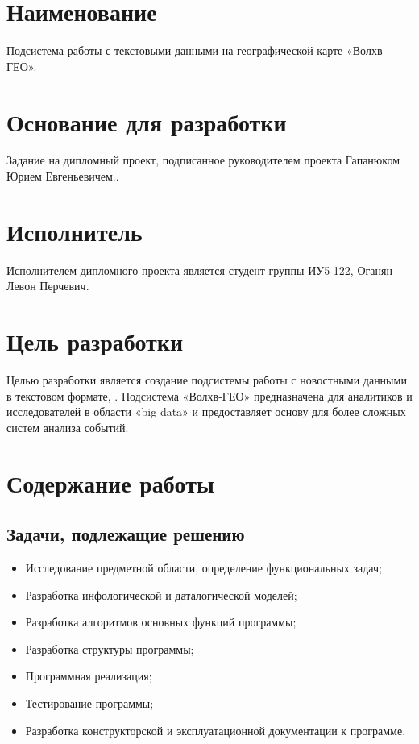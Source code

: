 \documentclass[russian,utf8,emptystyle]{eskdtext}
\newcounter{pageaux}
\begin{document}

\setcounter{pageaux}{1}
\setcounter{page}{122}
\tableofcontents

\clearpage  
\section{Наименование}

Подсистема работы с текстовыми данными на географической карте «Волхв-ГЕО».

\section{Основание для разработки}
Задание на дипломный проект, подписанное руководителем проекта Гапанюком Юрием Евгеньевичем..

\section{Исполнитель}

Исполнителем дипломного проекта является студент группы ИУ5-122, Оганян Левон Перчевич.

\section{Цель разработки}

Целью разработки является создание подсистемы работы с новостными данными в текстовом формате, . Подсистема «Волхв-ГЕО» предназначена для аналитиков и исследователей в области «big data» и предоставляет основу для более сложных систем анализа событий.

\section{Содержание работы}

\subsection{Задачи, подлежащие решению}
\begin{itemize}
\item Исследование предметной области, определение функциональных задач;
\item Разработка инфологической и даталогической моделей;
\item Разработка алгоритмов основных функций программы;
\item Разработка структуры программы;
\item Программная реализация;
\item Тестирование программы;
\item Разработка конструкторской и эксплуатационной документации к программе.
\end{itemize}
\end{document}
